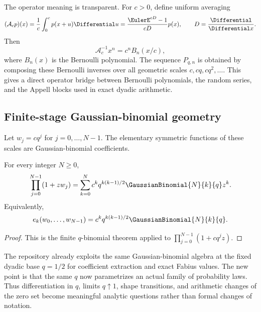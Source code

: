 \documentclass[11pt]{article}
\numberwithin{equation}{section}
\theoremstyle{definition}
\theoremstyle{remark}
\begin{document}
The operator meaning is transparent.  For $c>0$, define uniform averaging
\[
 (\mathcal A_cp)(x)=\frac1c\int_0^c p(x+u)\Differential u
 =\frac{\EulerE^{cD}-1}{cD}p(x),
 \qquad D=\frac{\Differential}{\Differential x}.
\]
Then
\begin{equation}
 \mathcal A_c^{-1}x^n=c^nB_n(x/c),                           \label{p10:eq:bernoulli-inverse}
\end{equation}
where $B_n(x)$ is the Bernoulli polynomial.  The sequence $P_{q,n}$ is obtained by composing
these Bernoulli inverses over all geometric scales $c,cq,cq^2,\ldots$.  This gives a direct
operator bridge between Bernoulli polynomials, the random series, and the Appell blocks used
in exact dyadic arithmetic.

\subsection{Finite-stage Gaussian-binomial geometry}

Let $w_j=cq^j$ for $j=0,\ldots,N-1$.  The elementary symmetric functions of these scales are
Gaussian-binomial coefficients.

\begin{proposition}
\label{p10:prop:qbinomial}
For every integer $N\ge0$,
\begin{equation}
 \prod_{j=0}^{N-1}(1+zw_j)
 =\sum_{k=0}^{N}c^kq^{k(k-1)/2}\GaussianBinomial{N}{k}{q}z^k.          \label{p10:eq:q-binomial-scales}
\end{equation}
Equivalently,
\begin{equation}
 e_k(w_0,\ldots,w_{N-1})
 =c^kq^{k(k-1)/2}\GaussianBinomial{N}{k}{q}.                           \label{p10:eq:elementary-scales}
\end{equation}
\end{proposition}

\begin{proof}
This is the finite $q$-binomial theorem applied to
$\prod_{j=0}^{N-1}(1+cq^jz)$.
\end{proof}

\begin{remark}
The repository already exploits the same Gaussian-binomial algebra at the fixed dyadic base
$q=1/2$ for coefficient extraction and exact Fabius values.  The new point is that the same
$q$ now parametrizes an actual family of probability laws.  Thus differentiation in $q$,
limits $q\uparrow1$, shape transitions, and arithmetic changes of the zero set become
meaningful analytic questions rather than formal changes of notation.
\end{remark}
\end{document}

